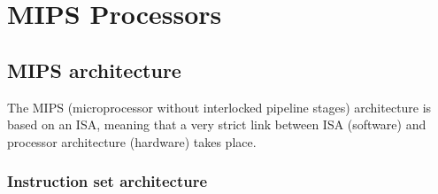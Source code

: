 \chapter{MIPS Processors}

\section {MIPS architecture}
The MIPS (microprocessor without interlocked pipeline stages) architecture is based on an ISA, meaning that a very strict link between ISA (software) and processor architecture (hardware) takes place.

\subsection{Instruction set architecture}

